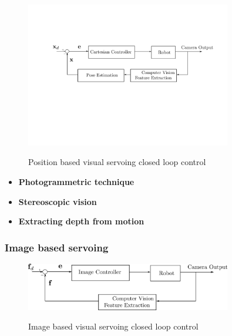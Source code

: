 \begin{center}
\begin{figure}[H]
\centering
\includegraphics[width=0.8\textwidth]{images/visual-servoing-position-based.png}\\
\caption{Position based visual servoing closed loop control}
\end{figure}
\end{center}

\begin{itemize}
\item \textbf{Photogrammetric technique}
\item \textbf{Stereoscopic vision}
\item \textbf{Extracting depth from motion}
\end{itemize}

\subsubsection{Image based servoing}

\begin{center}
\begin{figure}[H]
\centering
\includegraphics[width=0.8\textwidth]{images/visual-servoing-image-based.png}\\
\caption{Image based visual servoing closed loop control}
\end{figure}
\end{center}

